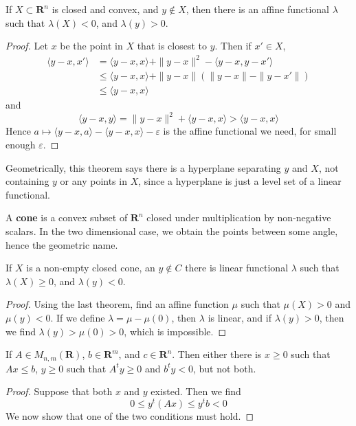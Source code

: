 \begin{theorem}
    If $X \subset \mathbf{R}^n$ is closed and convex, and $y \not \in X$, then there is an affine functional $\lambda$ such that $\lambda(X) < 0$, and $\lambda(y) > 0$.
\end{theorem}
\begin{proof}
    Let $x$ be the point in $X$ that is closest to $y$. Then if $x' \in X$,
    \begin{align*}
        \langle y - x, x' \rangle &= \langle y - x, x \rangle + \| y - x \|^2 - \langle y - x, y - x' \rangle\\
        &\leq \langle y - x, x \rangle + \| y - x \| \left( \| y - x \| - \| y - x' \| \right)\\
        &\leq \langle y - x, x \rangle
    \end{align*}
    and
    \[ \langle y - x , y \rangle = \| y - x \|^2 + \langle y - x, x \rangle > \langle y - x, x \rangle \]
    Hence $a \mapsto \langle y - x, a \rangle - \langle y - x, x \rangle - \varepsilon$ is the affine functional we need, for small enough $\varepsilon$.
\end{proof}

Geometrically, this theorem says there is a hyperplane separating $y$ and $X$, not containing $y$ or any points in $X$, since a hyperplane is just a level set of a linear functional.

A {\bf cone} is a convex subset of $\mathbf{R}^n$ closed under multiplication by non-negative scalars. In the two dimensional case, we obtain the points between some angle, hence the geometric name.

\begin{theorem}
    If $X$ is a non-empty closed cone, an $y \not \in C$ there is linear functional $\lambda$ such that $\lambda(X) \geq 0$, and $\lambda(y) < 0$.
\end{theorem}
\begin{proof}
    Using the last theorem, find an affine function $\mu$ such that $\mu(X) > 0$ and $\mu(y) < 0$. If we define $\lambda = \mu - \mu(0)$, then $\lambda$ is linear, and if $\lambda(y) > 0$, then we find $\lambda(y) > \mu(0) > 0$, which is impossible.
\end{proof}

\begin{theorem}[Farkas]
        If $A \in M_{n,m}(\mathbf{R})$, $b \in \mathbf{R}^m$, and $c \in \mathbf{R}^n$. Then either there is $x \geq 0$ such that $Ax \leq b$, $y \geq 0$ such that $A^t y \geq 0$ and $b^t y < 0$, but not both.
\end{theorem}
\begin{proof}
    Suppose that both $x$ and $y$ existed. Then we find
    \[ 0 \leq y^t (Ax) \leq y^t b < 0 \]
    We now show that one of the two conditions must hold.
\end{proof}

